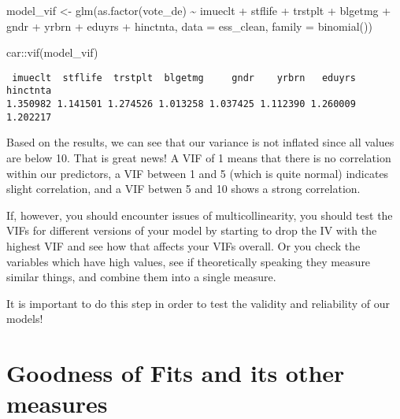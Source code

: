 \documentclass[
  letterpaper,
  DIV=11,
  numbers=noendperiod]{scrreprt}
\newenvironment{Shaded}{\begin{snugshade}}{\end{snugshade}}
\newcommand{\AttributeTok}[1]{\textcolor[rgb]{0.40,0.45,0.13}{#1}}
\newcommand{\FunctionTok}[1]{\textcolor[rgb]{0.28,0.35,0.67}{#1}}
\newcommand{\NormalTok}[1]{\textcolor[rgb]{0.00,0.23,0.31}{#1}}
\newcommand{\OtherTok}[1]{\textcolor[rgb]{0.00,0.23,0.31}{#1}}
\newcommand{\SpecialCharTok}[1]{\textcolor[rgb]{0.37,0.37,0.37}{#1}}
\begin{document}
\begin{Shaded}
\begin{Highlighting}[]
\NormalTok{model\_vif }\OtherTok{\textless{}{-}} \FunctionTok{glm}\NormalTok{(}\FunctionTok{as.factor}\NormalTok{(vote\_de) }\SpecialCharTok{\textasciitilde{}}\NormalTok{ imueclt  }\SpecialCharTok{+}\NormalTok{ stflife }\SpecialCharTok{+}\NormalTok{ trstplt }\SpecialCharTok{+}\NormalTok{ blgetmg }\SpecialCharTok{+} 
\NormalTok{                   gndr }\SpecialCharTok{+}\NormalTok{ yrbrn }\SpecialCharTok{+}\NormalTok{ eduyrs }\SpecialCharTok{+}\NormalTok{ hinctnta,}
                 \AttributeTok{data =}\NormalTok{ ess\_clean,}
                 \AttributeTok{family =} \FunctionTok{binomial}\NormalTok{())}

\NormalTok{car}\SpecialCharTok{::}\FunctionTok{vif}\NormalTok{(model\_vif)}
\end{Highlighting}
\end{Shaded}

\begin{verbatim}
 imueclt  stflife  trstplt  blgetmg     gndr    yrbrn   eduyrs hinctnta 
1.350982 1.141501 1.274526 1.013258 1.037425 1.112390 1.260009 1.202217 
\end{verbatim}

Based on the results, we can see that our variance is not inflated since
all values are below 10. That is great news! A VIF of 1 means that there
is no correlation within our predictors, a VIF between 1 and 5 (which is
quite normal) indicates slight correlation, and a VIF betwen 5 and 10
shows a strong correlation.

If, however, you should encounter issues of multicollinearity, you
should test the VIFs for different versions of your model by starting to
drop the IV with the highest VIF and see how that affects your VIFs
overall. Or you check the variables which have high values, see if
theoretically speaking they measure similar things, and combine them
into a single measure.

It is important to do this step in order to test the validity and
reliability of our models!

\hypertarget{goodness-of-fits-and-its-other-measures}{%
\chapter{Goodness of Fits and its other
measures}\label{goodness-of-fits-and-its-other-measures}}
\end{document}
